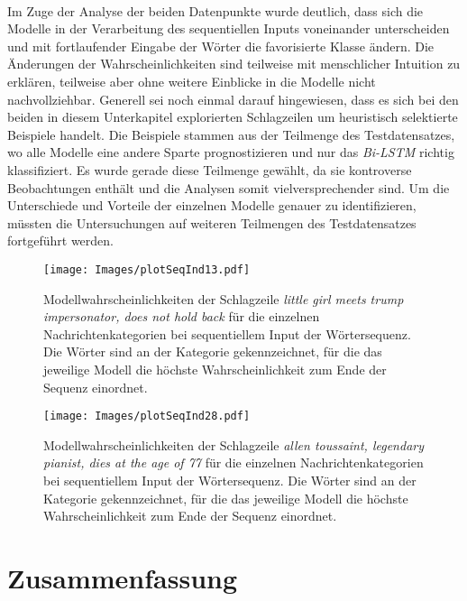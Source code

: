 \documentclass[a4paper,11pt]{article}
\begin{document}
\\
Im Zuge der Analyse der beiden Datenpunkte wurde deutlich, dass sich die Modelle in der Verarbeitung des sequentiellen Inputs voneinander unterscheiden und mit fortlaufender Eingabe der Wörter die favorisierte Klasse ändern. Die Änderungen der Wahrscheinlichkeiten sind teilweise mit menschlicher Intuition zu erklären, teilweise aber ohne weitere Einblicke in die Modelle nicht nachvollziehbar. Generell sei noch einmal darauf hingewiesen, dass es sich bei den beiden in diesem Unterkapitel explorierten Schlagzeilen um heuristisch selektierte Beispiele handelt. Die Beispiele stammen aus der Teilmenge des Testdatensatzes, wo alle Modelle eine andere Sparte prognostizieren und nur das \textit{Bi-LSTM} richtig klassifiziert. Es wurde gerade diese Teilmenge gewählt, da sie kontroverse Beobachtungen enthält und die Analysen somit vielversprechender sind. Um die Unterschiede und Vorteile der einzelnen Modelle genauer zu identifizieren, müssten die Untersuchungen auf weiteren  Teilmengen des Testdatensatzes fortgeführt werden.

\begin{figure}[H]
    \centering
\texttt{[image: Images/plotSeqInd13.pdf]} 
\caption{Modellwahrscheinlichkeiten der Schlagzeile \textit{little girl meets trump impersonator, does not hold back} für die einzelnen Nachrichtenkategorien bei sequentiellem Input der Wörtersequenz. Die Wörter sind an der Kategorie gekennzeichnet, für die das jeweilige Modell die höchste Wahrscheinlichkeit zum Ende der Sequenz einordnet.}
\label{abb:plotSeqInd13}
\end{figure}


\begin{figure}[H]
    \centering
\texttt{[image: Images/plotSeqInd28.pdf]} 
\caption{Modellwahrscheinlichkeiten der Schlagzeile \textit{allen toussaint, legendary pianist, dies at the age of 77} für die einzelnen Nachrichtenkategorien bei sequentiellem Input der Wörtersequenz. Die Wörter sind an der Kategorie gekennzeichnet, für die das jeweilige Modell die höchste Wahrscheinlichkeit zum Ende der Sequenz einordnet.}
\label{abb:plotSeqInd28}
\end{figure}




\section{Zusammenfassung}\label{kap:5}
\end{document}
